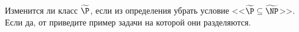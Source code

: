 Изменится ли класс $\widetilde{\P}$, если из определения убрать условие <<$\widetilde{\P} \subseteq
\widetilde{\NP}$>>. Если да, от приведите пример задачи на которой они разделяются.
